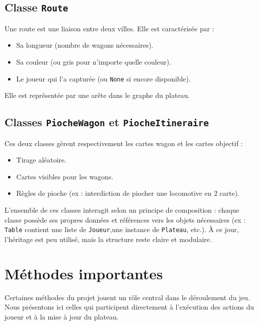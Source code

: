 \documentclass[a4paper,12pt]{report}
\begin{document}
\subsection*{Classe \texttt{Route}}

Une route est une liaison entre deux villes. Elle est caractérisée par :
\begin{itemize}
    \item Sa longueur (nombre de wagons nécessaires).
    \item Sa couleur (ou gris pour n’importe quelle couleur).
    \item Le joueur qui l’a capturée (ou \texttt{None} si encore disponible).
\end{itemize}
Elle est représentée par une arête dans le graphe du plateau.

\subsection*{Classes \texttt{PiocheWagon} et \texttt{PiocheItineraire}}

Ces deux classes gèrent respectivement les cartes wagon et les cartes objectif :
\begin{itemize}
    \item Tirage aléatoire.
    \item Cartes visibles pour les wagons.
    \item Règles de pioche (ex : interdiction de piocher une locomotive en 2 carte).
\end{itemize}

\vspace{1em}
L’ensemble de ces classes interagit selon un principe de composition :
chaque classe possède ses propres données et références vers les objets nécessaires
(ex : \texttt{Table} contient une liste de \texttt{Joueur},une instance de \texttt{Plateau}, etc.).
À ce jour, l’héritage est peu utilisé, mais la structure reste claire et modulaire.



\section{Méthodes importantes}

Certaines méthodes du projet jouent un rôle central dans le déroulement du jeu.
Nous présentons ici celles qui participent directement à l'exécution des actions du joueur et à la mise à jour du plateau.
\end{document}
